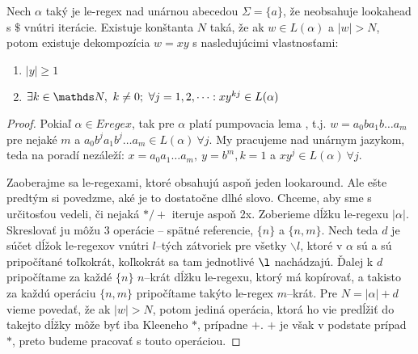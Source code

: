\begin{veta}
Nech $\alpha$ taký je le-regex nad unárnou abecedou $\Sigma = \lbrace a \rbrace$, že neobsahuje lookahead s $\mathdollar$ vnútri iterácie.  Existuje konštanta $N$ taká, že ak $w \in L(\alpha)$ a $\vert w \vert > N$, potom existuje dekompozícia $w=xy$ s nasledujúcimi vlastnosťami:
\begin{enumerate}
\item $\vert y \vert \geq 1$
\item $\exists k \in \N,~k\neq 0;~\forall j = 1,2,\dots: xy^{kj} \in L(\alpha)$
\end{enumerate}
\end{veta}
\begin{proof}
Pokiaľ $\alpha \in Eregex$, tak pre $\alpha$ platí pumpovacia lema \cite[Lemma 1]{ExtendedRegexPower}, t.j. $w = a_0ba_1b\dots a_m$ pre nejaké $m$ a $a_0b^ja_1b^j\dots a_m \in L(\alpha)~\forall j$. My pracujeme nad unárnym jazykom, teda na poradí nezáleží: $x=a_0a_1\dots a_m,~y=b^m, k=1$ a $xy^j \in L(\alpha)~\forall j$.

Zaoberajme sa le-regexami, ktoré obsahujú aspoň jeden lookaround. Ale ešte predtým si povedzme, aké je to dostatočne dlhé slovo. Chceme, aby sme s určitosťou vedeli, či nejaká $*/+$ iteruje aspoň 2x. Zoberieme dĺžku le-regexu $\vert \alpha \vert$. Skreslovať ju môžu 3 ope\-rá\-cie -- spätné referencie, $\lbrace n \rbrace$ a $\lbrace n,m \rbrace$. Nech teda $d$ je súčet dĺžok le-regexov vnútri $l$--tých zátvoriek pre všetky $\backslash l$, ktoré v $\alpha$ sú a sú pripočítané toľkokrát, koľkokrát sa tam jednotlivé $\l$ nachádzajú. Ďalej k $d$ pripočítame za každé $\lbrace n \rbrace$ $n$--krát dĺžku le-regexu, ktorý má kopírovať, a takisto za každú operáciu $\lbrace n,m \rbrace$ pripočítame takýto le-regex $m$--krát. Pre $N = \vert \alpha \vert + d$ vieme povedať, že ak $\vert w \vert > N$, potom jediná operácia, ktorá ho vie predĺžiť do takejto dĺžky môže byť iba Kleeneho $*$, prípadne $+$. $+$ je však v podstate prípad $*$, preto budeme pracovať s touto operáciou.


\end{proof}
